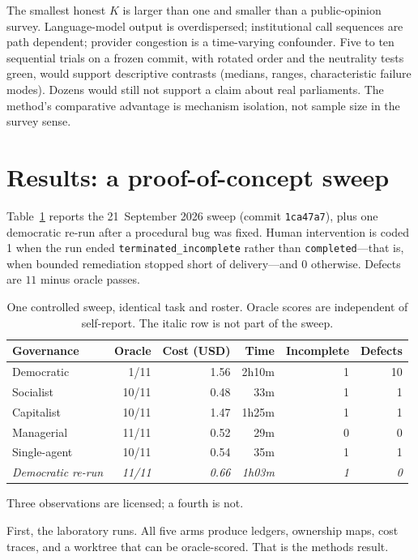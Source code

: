 \documentclass[11pt,a4paper]{article}
\begin{document}
The smallest honest $K$ is larger than one and smaller than a public-opinion survey.
Language-model output is overdispersed; institutional call sequences are path dependent;
provider congestion is a time-varying confounder. Five to ten sequential trials on a
frozen commit, with rotated order and the neutrality tests green, would support
descriptive contrasts (medians, ranges, characteristic failure modes). Dozens would
still not support a claim about real parliaments. The method's comparative advantage is
mechanism isolation, not sample size in the survey sense.

\section{Results: a proof-of-concept sweep}
\label{sec:results}

Table~\ref{tab:sweep} reports the 21~September 2026 sweep (commit \texttt{1ca47a7}), plus
one democratic re-run after a procedural bug was fixed. Human intervention is coded 1
when the run ended \texttt{terminated\_incomplete} rather than \texttt{completed}---that
is, when bounded remediation stopped short of delivery---and 0 otherwise. Defects are
$11$ minus oracle passes.

\begin{table}[t]
\centering
\caption{One controlled sweep, identical task and roster. Oracle scores are independent
of self-report. The italic row is not part of the sweep.}
\label{tab:sweep}
\begin{tabular}{@{}lrrrrr@{}}
\toprule
Governance & Oracle & Cost (USD) & Time & Incomplete & Defects \\
\midrule
Democratic & 1/11 & 1.56 & 2h10m & 1 & 10 \\
Socialist & 10/11 & 0.48 & 33m & 1 & 1 \\
Capitalist & 10/11 & 1.47 & 1h25m & 1 & 1 \\
Managerial & 11/11 & 0.52 & 29m & 0 & 0 \\
Single-agent & 10/11 & 0.54 & 35m & 1 & 1 \\
\midrule
\textit{Democratic re-run} & \textit{11/11} & \textit{0.66} & \textit{1h03m} & \textit{1} & \textit{0} \\
\bottomrule
\end{tabular}
\end{table}

Three observations are licensed; a fourth is not.

First, the laboratory runs. All five arms produce ledgers, ownership maps, cost traces,
and a worktree that can be oracle-scored. That is the methods result.
\end{document}
